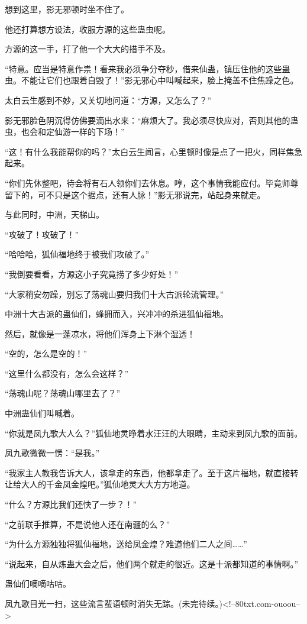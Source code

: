 \begin{this_body}
想到这里，影无邪顿时坐不住了。

他还打算想方设法，收服方源的这些蛊虫呢。

方源的这一手，打了他一个大大的措手不及。

“特意。应当是特意作祟！看来我必须争分夺秒，借来仙蛊，镇压住他的这些蛊虫。不能让它们也跟着自毁了！”影无邪心中叫喊起来，脸上掩盖不住焦躁之色。

太白云生感到不妙，又关切地问道：“方源，又怎么了？”

影无邪脸色阴沉得仿佛要滴出水来：“麻烦大了。我必须尽快应对，否则其他的蛊虫，也会和定仙游一样的下场！”

“这！有什么我能帮你的吗？”太白云生闻言，心里顿时像是点了一把火，同样焦急起来。

“你们先休整吧，待会将有石人领你们去休息。哼，这个事情我能应付。毕竟师尊留下的，可不只是这个据点，还有人脉！”影无邪说完，站起身来就走。

与此同时，中洲，天梯山。

“攻破了！攻破了！”

“哈哈哈，狐仙福地终于被我们攻破了。”

“我倒要看看，方源这小子究竟捞了多少好处！”

“大家稍安勿躁，别忘了荡魂山要归我们十大古派轮流管理。”

中洲十大古派的蛊仙们，蜂拥而入，兴冲冲的杀进狐仙福地。

然后，就像是一蓬凉水，将他们浑身上下淋个湿透！

“空的，怎么是空的！”

“这里什么都没有，怎么会这样？”

“荡魂山呢？荡魂山哪里去了？”

中洲蛊仙们叫喊着。

“你就是凤九歌大人么？”狐仙地灵睁着水汪汪的大眼睛，主动来到凤九歌的面前。

凤九歌微微一愣：“是我。”

“我家主人教我告诉大人，该拿走的东西，他都拿走了。至于这片福地，就直接转让给大人的千金凤金煌吧。”狐仙地灵大大方方地道。

“什么？方源比我们还快了一步？！”

“之前联手推算，不是说他人还在南疆的么？”

“为什么方源独独将狐仙福地，送给凤金煌？难道他们二人之间……”

“说起来，自从炼蛊大会之后，他们两个就走的很近。这是十派都知道的事情啊。”

蛊仙们嘀嘀咕咕。

凤九歌目光一扫，这些流言蜚语顿时消失无踪。(未完待续。)<!--80txt.com-ouoou-->

\end{this_body}

